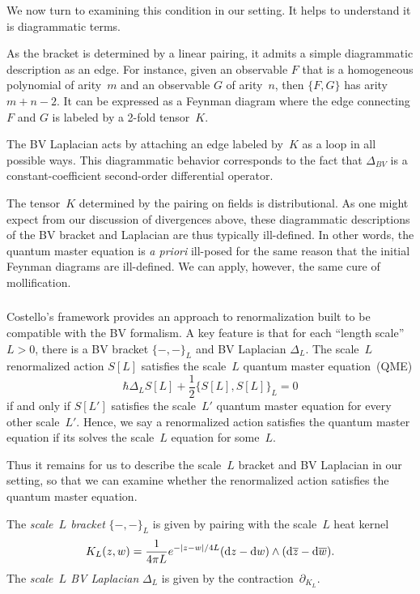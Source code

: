 We now turn to examining this condition in our setting.
It helps to understand it is diagrammatic terms.

As the bracket is determined by a linear pairing,
it admits a simple diagrammatic description as an edge.
For instance, given an observable $F$ that is a homogeneous polynomial of arity~$m$
and an observable $G$ of arity~$n$, 
then $\{F,G\}$ has arity~$m+n-2$.
It can be expressed as a Feynman diagram 
where the edge connecting $F$ and $G$ is labeled by a 2-fold tensor~$K$.

The BV Laplacian acts by attaching an edge labeled by~$K$ as a loop in all possible ways.
This diagrammatic behavior corresponds to the fact that $\Delta_{BV}$ is a constant-coefficient second-order differential operator.

The tensor~$K$ determined by the pairing on fields is distributional.
As one might expect from our discussion of divergences above,
these diagrammatic descriptions of the BV bracket and Laplacian are thus typically ill-defined.
In other words, the quantum master equation is {\em a priori} ill-posed for the same reason that the initial Feynman diagrams are ill-defined.
We can apply, however, the same cure of mollification.

\subsubsection{}

Costello's framework \cite{CosBook} provides an approach to renormalization built to be compatible with the BV formalism.
A key feature is that for each ``length scale''~$L>0$, 
there is a BV bracket $\{-,-\}_L$ and BV Laplacian $\Delta_L$.
The scale~$L$ renormalized action $S[L]$ satisfies the scale~$L$ quantum master equation~(QME)
\[
\hbar \Delta_{L} S[L] + \frac{1}{2}\{S[L],S[L]\}_L = 0
\]
if and only if $S[L']$ satisfies the scale~$L'$ quantum master equation for every other scale~$L'$.
Hence, we say a renormalized action satisfies the quantum master equation if its solves the scale~$L$ equation for some~$L$.

Thus it remains for us to describe the scale~$L$ bracket and BV Laplacian in our setting,
so that we can examine whether the renormalized action satisfies the quantum master equation.

\begin{dfn}
The {\em scale~$L$ bracket} $\{-,-\}_L$ is given by pairing with the scale~$L$ heat kernel
\[
K_L(z,w) = \frac{1}{4\pi L} e^{-|z-w|/4L} ({\rm d} z - {\rm d} w) \wedge ({\rm d}\overline{z} - {\rm d}\overline{w}). 
\]
The {\em scale~$L$ BV Laplacian} $\Delta_L$ is given by the contraction~$\partial_{K_L}$.
\end{dfn}

